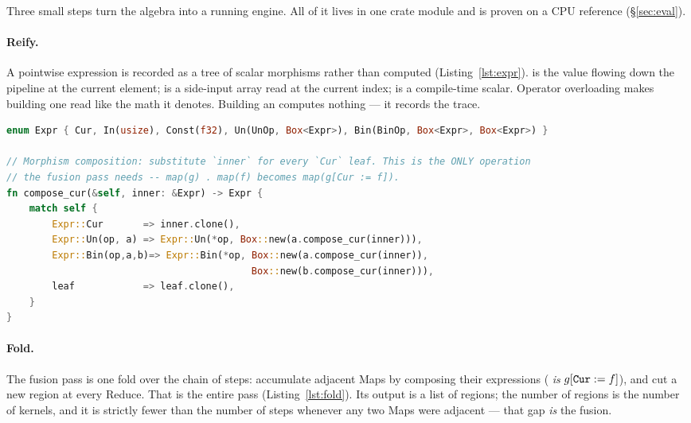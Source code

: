 \documentclass[11pt]{article}
\begin{document}
Three small steps turn the algebra into a running engine. All of it lives in one crate module and is
proven on a CPU reference (\S\ref{sec:eval}).

\paragraph{Reify.} A pointwise expression is recorded as a tree of scalar morphisms rather than computed
(Listing~\ref{lst:expr}).  is the value flowing down the pipeline at the current element;
 is a side-input array read at the current index;  is a compile-time scalar.
Operator overloading makes building one read like the math it denotes. Building an  computes
nothing --- it records the trace.

\begin{lstlisting}[language=Rust,caption={The op algebra. The whole fusible surface is a tree of unary
and binary pointwise morphisms over the current value, side inputs, and constants.},label={lst:expr}]
enum Expr { Cur, In(usize), Const(f32), Un(UnOp, Box<Expr>), Bin(BinOp, Box<Expr>, Box<Expr>) }

// Morphism composition: substitute `inner` for every `Cur` leaf. This is the ONLY operation
// the fusion pass needs -- map(g) . map(f) becomes map(g[Cur := f]).
fn compose_cur(&self, inner: &Expr) -> Expr {
    match self {
        Expr::Cur       => inner.clone(),
        Expr::Un(op, a) => Expr::Un(*op, Box::new(a.compose_cur(inner))),
        Expr::Bin(op,a,b)=> Expr::Bin(*op, Box::new(a.compose_cur(inner)),
                                           Box::new(b.compose_cur(inner))),
        leaf            => leaf.clone(),
    }
}
\end{lstlisting}

\paragraph{Fold.} The fusion pass is one fold over the chain of steps: accumulate adjacent Maps by
composing their expressions ( \emph{is} $g[\texttt{Cur}:=f]$), and cut a new region at
every Reduce. That is the entire pass (Listing~\ref{lst:fold}). Its output is a list of regions; the
number of regions is the number of kernels, and it is strictly fewer than the number of steps whenever
any two Maps were adjacent --- that gap \emph{is} the fusion.
\end{document}
